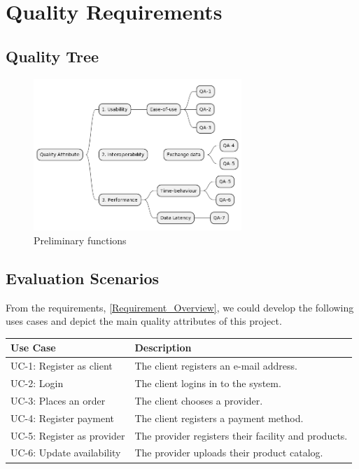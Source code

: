 \section{Quality Requirements}

\subsection{Quality Tree}

\begin{figure}[H]
    \centering
    \includegraphics[width=0.7\textwidth]{assets/quality_tree.png}
    \caption{Preliminary functions}
    \label{fig:preliminary_use_case}
\end{figure}


\subsection{Evaluation Scenarios} 
From the requirements, \ref{Requirement_Overview}, we could develop the following uses cases and depict the main quality 
attributes of this project. 

\begin{table}[H]
    \begin{tabularx}{\textwidth}{lX}
    \toprule
    Use Case & Description  \\
    \midrule
    UC-1: Register as \gls{client} & The \gls{client} registers an e-mail address.\\
    UC-2: Login & The \gls{client} logins in to the system. \\
    UC-3: Places an order & The \gls{client} chooses a \gls{provider}. \\
    UC-4: Register payment & The \gls{client} registers a payment method. \\
    UC-5: Register as \gls{provider} & The \gls{provider} registers their facility and products. \\
    UC-6: Update availability & The \gls{provider} uploads their product catalog. \\
    \bottomrule
    \end{tabularx}
\end{table}

